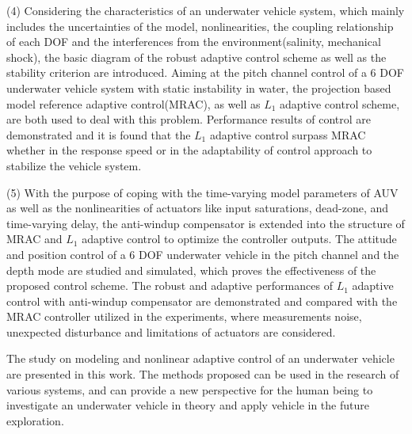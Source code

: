 \begin{englishabstract}
(4) Considering the characteristics of an underwater vehicle system, which mainly includes the uncertainties of the model, nonlinearities, the coupling relationship of each DOF and the interferences from the environment(salinity, mechanical shock), the basic diagram of the robust adaptive control scheme as well as the stability criterion are introduced. Aiming at the pitch channel control of a 6 DOF underwater vehicle system with static instability in water, the projection based model reference adaptive control(MRAC), as well as $L_1$ adaptive control scheme, are both used to deal with this problem. Performance results of control are demonstrated and it is found that the $L_1$ adaptive control surpass MRAC whether in the response speed or in the adaptability of control approach to stabilize the vehicle system.

(5) With the purpose of coping with the time-varying model parameters of AUV as well as the nonlinearities of actuators like input saturations, dead-zone, and time-varying delay, the anti-windup compensator is extended into the structure of MRAC and $L_1$ adaptive control to optimize the controller outputs. The attitude and position control of a 6 DOF underwater vehicle in the pitch channel and the depth mode are studied and simulated, which proves the effectiveness of the proposed control scheme. The robust and adaptive performances of $L_1$ adaptive control with anti-windup compensator are demonstrated and compared with the MRAC controller utilized in the experiments, where measurements noise, unexpected disturbance and limitations of actuators are considered.

The study on modeling and nonlinear adaptive control of an underwater vehicle are presented in this work. The methods proposed can be used in the research of various systems, and can provide a new perspective for the human being to investigate an underwater vehicle in theory and apply vehicle in the future exploration.



\end{englishabstract}
